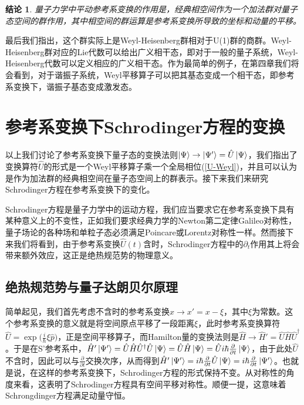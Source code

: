 \documentclass[a4paper]{article}
\newtheorem*{conclusion}{结论}
\begin{document}
        \begin{conclusion}
            量子力学中平动参考系变换的作用是，经典相空间作为一个加法群对量子态空间的群作用，其中相空间的群运算是参考系变换所导致的坐标和动量的平移。
        \end{conclusion}
    
        最后我们指出，这个群实际上是Weyl-Heisenberg群\cite{bib:ten}相对于U(1)群的商群。Weyl-Heisenberg群对应的Lie代数可以给出广义相干态\cite{bib:ten, bib:thirteen}，即对于一般的量子系统，Weyl-Heisenberg代数可以定义相应的广义相干态。作为最简单的例子，在第四章我们将会看到，对于谐振子系统，Weyl平移算子可以把其基态变成一个相干态，即参考系变换下，谐振子基态变成激发态。




    \section{参考系变换下Schrodinger方程的变换}

        以上我们讨论了参考系变换下量子态的变换法则$\ket{\Psi}\to\ket{\Psi'}=\hat{U}\ket{\Psi}$，我们指出了变换算符$\hat{U}$的形式是一个Weyl平移算子乘一个全局相位(\ref{U-Weyl})，并且可以认为是作为加法群的经典相空间在量子态空间上的群表示。接下来我们来研究Schrodinger方程在参考系变换下的变化。

        Schrodinger方程是量子力学中的运动方程，我们应当要求它在参考系变换下具有某种意义上的不变性，正如我们要求经典力学的Newton第二定律Galileo对称性，量子场论的各种场和单粒子态必须满足Poincare或Lorentz对称性一样。然而接下来我们将看到，由于参考系变换$\hat{U}(t)$含时，Schrodinger方程中的$\partial_t$作用其上将会带来额外效应，这正是绝热规范势\cite{bib:twelve}的物理意义。

    \subsection{绝热规范势与量子达朗贝尔原理}

        简单起见，我们首先考虑不含时的参考系变换$x\rightarrow x'=x-\xi$，其中$\xi$为常数。这个参考系变换的意义就是将空间原点平移了一段距离$\xi$，此时参考系变换算符$\hat{U}=\exp\big(\frac{i}{\hbar}\xi\hat{p} \big)$，正是空间平移算子，而Hamilton量的变换法则是$\hat{H}\rightarrow \hat{H}'=\hat{U}\hat{H}\hat{U}^\dagger$。于是在S'参考系中，$\hat{H}'\ket{\Psi'}=\hat{U}\hat{H}\hat{U}^\dagger\hat{U}\ket{\Psi}=\hat{U}\hat{H}\ket{\Psi}=\hat{U} i\hbar\frac{\partial}{\partial t}\ket{\Psi}$，由于此处$\hat{U}$不含时，因此可以与$\frac{\partial}{\partial t}$交换次序，从而得到$\hat{H}'\ket{\Psi'}=i\hbar\frac{\partial}{\partial t}\hat{U}\ket{\Psi}=i\hbar\frac{\partial}{\partial t}\ket{\Psi'}$。也就是说，在这样的参考系变换下，Schrodinger方程的形式保持不变。从对称性的角度来看，这表明了Schrodinger方程具有空间平移对称性。顺便一提，这意味着Schrongdinger方程满足动量守恒。
\end{document}
